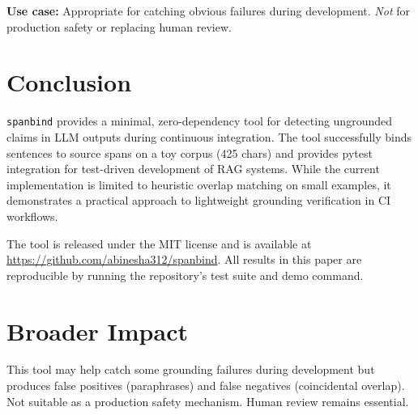 \documentclass{article}
\begin{document}
\textbf{Use case:} Appropriate for catching obvious failures during development. \textit{Not} for production safety or replacing human review.

\section{Conclusion}

\texttt{spanbind} provides a minimal, zero-dependency tool for detecting ungrounded claims in LLM outputs during continuous integration. The tool successfully binds sentences to source spans on a toy corpus (425 chars) and provides pytest integration for test-driven development of RAG systems. While the current implementation is limited to heuristic overlap matching on small examples, it demonstrates a practical approach to lightweight grounding verification in CI workflows.

The tool is released under the MIT license and is available at \url{https://github.com/abinesha312/spanbind}. All results in this paper are reproducible by running the repository's test suite and demo command.

\section*{Broader Impact}

This tool may help catch some grounding failures during development but produces false positives (paraphrases) and false negatives (coincidental overlap). Not suitable as a production safety mechanism. Human review remains essential.
\end{document}
